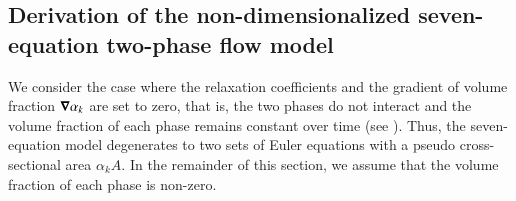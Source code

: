 \documentclass[preprint,10pt]{elsarticle}
\begin{document}
\subsection{Derivation of the non-dimensionalized seven-equation two-phase flow model}\label{sec:scaled-SEM}
We consider the case where the relaxation coefficients and the gradient of volume fraction $\boldsymbol\nabla \alpha_k$ are set to zero, that is, 
  
the two phases do not interact and the volume fraction of each phase remains constant over time (see ). 
Thus, the seven-equation model degenerates to two sets of Euler equations with a pseudo cross-sectional area $\alpha_k A$. In 
the remainder of this section, we assume that the volume fraction of each phase is non-zero.
\end{document}

